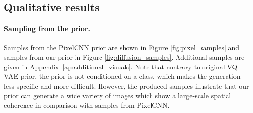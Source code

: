 \documentclass{article}
\theoremstyle{plain}
\theoremstyle{definition}
\theoremstyle{remark}
\begin{document}
\begin{table}
\centering
    \caption{Results on \textit{mini}ImageNet. Metrics are computed on the validation dataset. The means are displayed along with the standard deviation in parenthesis.}
    \label{tab:miniimagenet}
\end{table}

\begin{table}
\centering
    \caption{Results on CIFAR10. Metrics are computed on the validation dataset. The means are displayed along with the standard deviation in parenthesis.}
    \label{tab:cifar}
\end{table}


\subsection{Qualitative results}
\paragraph{Sampling from the prior. }
Samples from the PixelCNN prior are shown in Figure \ref{fig:pixel_samples}
and samples from our prior in Figure \ref{fig:diffusion_samples}. Additional samples are given in Appendix~\ref{ap:additional_visuals}. Note that contrary to original VQ-VAE prior, the prior is not conditioned on a class, which makes the generation less specific and more difficult. However, the produced samples illustrate that our prior can generate a wide variety of images which show a large-scale spatial coherence in comparison with samples from PixelCNN.
\end{document}
